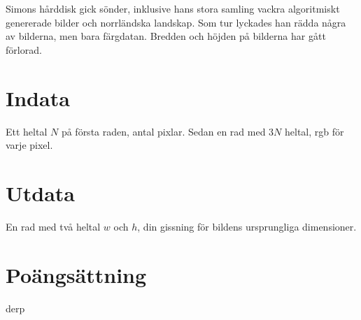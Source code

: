 
Simons hårddisk gick sönder, inklusive hans stora samling vackra algoritmiskt genererade bilder och norrländska landskap. Som tur lyckades han rädda några av bilderna, men bara färgdatan. Bredden och höjden på bilderna har gått förlorad.

\section*{Indata}
Ett heltal $N$ på första raden, antal pixlar. Sedan en rad med $3N$ heltal, rgb för varje pixel.

\section*{Utdata}
En rad med två heltal $w$ och $h$, din gissning för bildens ursprungliga dimensioner.

\section*{Poängsättning}
derp

